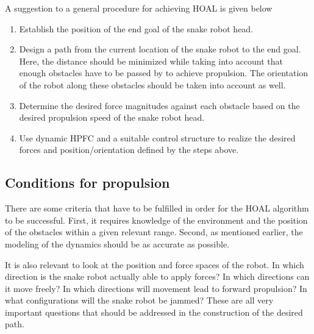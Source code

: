 
A suggestion to a general procedure for achieving HOAL is given below

\begin{enumerate}
    \item Establish the position of the end goal of the snake robot head.
    \item Design a path from the current location of the snake robot to the end goal. Here, the distance should be minimized while taking into account that enough obstacles have to be passed by to achieve propulsion. The orientation of the robot along these obstacles should be taken into account as well.
    \item Determine the desired force magnitudes against each obstacle based on the desired propulsion speed of the snake robot head.
    \item Use dynamic HPFC and a suitable control structure to realize the desired forces and position/orientation defined by the steps above.
\end{enumerate}

\subsection{Conditions for propulsion}\label{subsec:prop-conditions}

There are some criteria that have to be fulfilled in order for the HOAL algorithm to be successful. First, it requires knowledge of the environment and the position of the obstacles within a given relevant range. Second, as mentioned earlier, the modeling of the dynamics should be as accurate as possible.

It is also relevant to look at the position and force spaces of the robot. In which direction is the snake robot actually able to apply forces? In which directions can it move freely? In which directions will movement lead to forward propulsion? In what configurations will the snake robot be jammed? These are all very important questions that should be addressed in the construction of the desired path.

